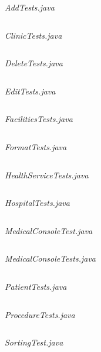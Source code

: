 \documentclass{article}
\begin{document}
	\textit{AddTests.java} 
	\inputminted{java}{src/test/java/com/yvesstraten/medicalconsole/tests/AddTests.java}

	\textit{ClinicTests.java} 
	\inputminted{java}{src/test/java/com/yvesstraten/medicalconsole/tests/ClinicTests.java}

	\textit{DeleteTests.java} 
	\inputminted{java}{src/test/java/com/yvesstraten/medicalconsole/tests/DeleteTests.java}

	\textit{EditTests.java} 
	\inputminted{java}{src/test/java/com/yvesstraten/medicalconsole/tests/EditTests.java}

	\textit{FacilitiesTests.java} 
	\inputminted{java}{src/test/java/com/yvesstraten/medicalconsole/tests/FacilitiesTests.java}

	\textit{FormatTests.java} 
	\inputminted{java}{src/test/java/com/yvesstraten/medicalconsole/tests/FormatTests.java}

	\textit{HealthServiceTests.java} 
	\inputminted{java}{src/test/java/com/yvesstraten/medicalconsole/tests/HealthServiceTests.java}

	\textit{HospitalTests.java} 
	\inputminted{java}{src/test/java/com/yvesstraten/medicalconsole/tests/HospitalTests.java}

	\textit{MedicalConsoleTest.java} 
	\inputminted{java}{src/test/java/com/yvesstraten/medicalconsole/tests/MedicalConsoleTest.java}

	\textit{MedicalConsoleTests.java} 
	\inputminted{java}{src/test/java/com/yvesstraten/medicalconsole/tests/MedicalConsoleTests.java}

	\textit{PatientTests.java} 
	\inputminted{java}{src/test/java/com/yvesstraten/medicalconsole/tests/PatientTests.java}

	\textit{ProcedureTests.java} 
	\inputminted{java}{src/test/java/com/yvesstraten/medicalconsole/tests/ProcedureTests.java}

	\textit{SortingTest.java} 
	\inputminted{java}{src/test/java/com/yvesstraten/medicalconsole/tests/SortingTest.java}
\end{document}
